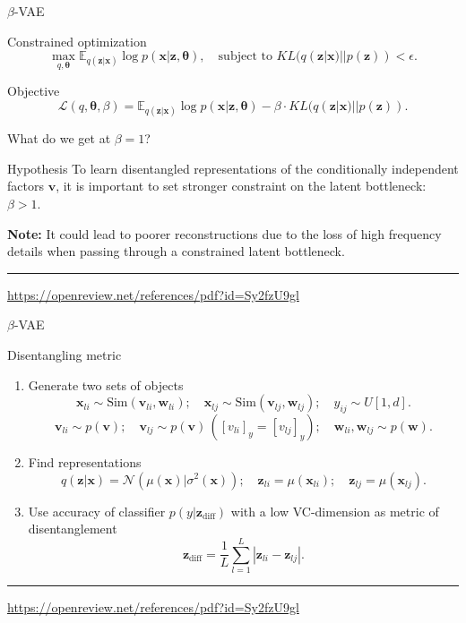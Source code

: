 \documentclass{beamer}
\newcommand{\bv}{\mathbf{v}}
\newcommand{\bw}{\mathbf{w}}
\newcommand{\bx}{\mathbf{x}}
\newcommand{\bz}{\mathbf{z}}
\newcommand{\btheta}{\boldsymbol{\theta}}
\begin{document}
\begin{frame}{$\beta$-VAE}
\begin{block}{Constrained optimization}
\vspace{-0.5cm}
\[
    \max_{q, \btheta} \mathbb{E}_{q(\bz | \bx)} \log p(\bx | \bz, \btheta), \quad \text{subject to } KL (q(\bz | \bx) || p(\bz)) < \epsilon.
\]
\vspace{-0.5cm}
\end{block}
\begin{block}{Objective}
\vspace{-0.5cm}
\[
    \mathcal{L}(q, \btheta, \beta) = \mathbb{E}_{q(\bz | \bx)} \log p(\bx | \bz, \btheta) - \beta \cdot KL (q(\bz | \bx) || p(\bz)).
\]
\end{block}
What do we get at $\beta = 1$? \\
\begin{block}{Hypothesis}
To learn disentangled representations of the conditionally independent factors $\bv$, it is important to set stronger constraint on the latent bottleneck: $\beta > 1$.
\end{block}
\textbf{Note:} It could lead to poorer reconstructions due to the loss of high frequency details when passing through a constrained latent bottleneck. \\ 
\vspace{0.1cm}
\vfill
\hrule\medskip
{\scriptsize \href{https://openreview.net/references/pdf?id=Sy2fzU9gl}{https://openreview.net/references/pdf?id=Sy2fzU9gl}}
\end{frame}
\begin{frame}{$\beta$-VAE}
\begin{block}{Disentangling metric}
	\begin{enumerate}
		\item Generate two sets of objects
		\[
		\bx_{li} \sim \text{Sim}(\bv_{li}, \bw_{li}); \quad \bx_{lj} \sim \text{Sim}(\bv_{lj}, \bw_{lj}); \quad y_{ij} \sim U[1, d].
		\]
		\[
		\bv_{li} \sim p(\bv); \quad \bv_{lj} \sim p(\bv) \, ([v_{li}]_y = [v_{lj}]_y); \quad \bw_{li}, \bw_{lj} \sim p(\bw).
		\]
		\item Find representations
		\[
		q(\bz | \bx) = \mathcal{N}\left(\mu(\bx) | \sigma^2(\bx)\right); \quad \bz_{li} = \mu(\bx_{li}); \quad \bz_{lj} = \mu(\bx_{lj}).
		\]
		\item Use accuracy of classifier $p(y | \bz_{\text{diff}})$ with a low VC-dimension as metric of disentanglement
		\[
		\bz_{\text{diff}} = \frac{1}{L} \sum_{l=1}^L | \bz_{li} - \bz_{lj} |.
		\]
	\end{enumerate}

\end{block}

\vfill
\hrule\medskip
{\scriptsize \href{https://openreview.net/references/pdf?id=Sy2fzU9gl}{https://openreview.net/references/pdf?id=Sy2fzU9gl}}
\end{frame}
\end{document}
